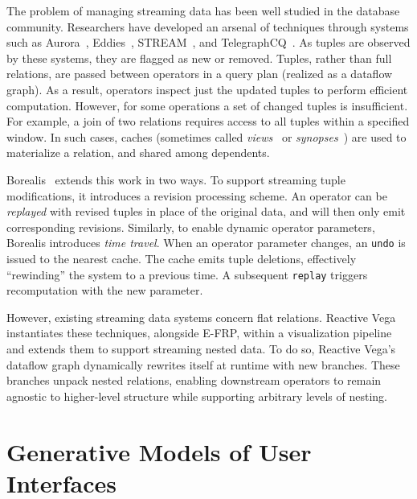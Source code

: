 \vspace{-10pt}

The problem of managing streaming data has been well studied in the database
community. Researchers have developed an arsenal of techniques through systems
such as Aurora~\cite{abadi:aurora}, Eddies~\cite{avnur:eddies},
STREAM~\cite{arasu:stream}, and TelegraphCQ~\cite{chandrasekaran:telegraphcq}.
As tuples are observed by these systems, they are flagged as new or removed.
Tuples, rather than full relations, are passed between operators in a query plan
(realized as a dataflow graph). As a result, operators inspect just the updated
tuples to perform efficient computation. However, for some operations a set of
changed tuples is insufficient. For example, a join of two relations requires
access to all tuples within a specified window. In such cases, caches (sometimes
called \emph{views}~\cite{abadi:aurora} or \emph{synopses}~\cite{arasu:stream})
are used to materialize a relation, and shared among dependents.

Borealis~\cite{abadi:borealis} extends this work in two ways. To support
streaming tuple modifications, it introduces a revision processing scheme. An
operator can be \emph{replayed} with revised tuples in place of the original
data, and will then only emit corresponding revisions. Similarly, to enable
dynamic operator parameters, Borealis introduces \emph{time travel}. When an
operator parameter changes, an \texttt{undo} is issued to the nearest cache. The
cache emits tuple deletions, effectively ``rewinding'' the system to a previous
time. A subsequent \texttt{replay} triggers recomputation with the new
parameter.

However, existing streaming data systems concern flat relations. Reactive Vega
instantiates these techniques, alongside E-FRP, within a visualization pipeline
and extends them to support streaming nested data. To do so, Reactive Vega's
dataflow graph dynamically rewrites itself at runtime with new branches. These
branches unpack nested relations, enabling downstream operators to remain
agnostic to higher-level structure while supporting arbitrary levels of nesting.

\vspace{-20pt}

\section{Generative Models of User Interfaces}

\vspace{-15pt}

